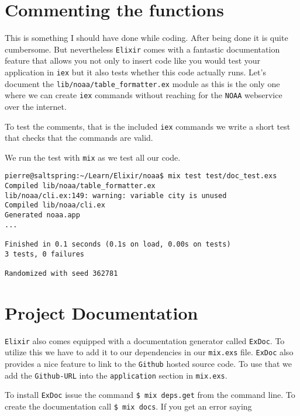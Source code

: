 \documentclass[10pt, a4paper]{article}
\newcommand{\includecode}[3]{}
\begin{document}
\section{Commenting the functions}
This is something I should have done while coding. After being done it is 
quite cumbersome. But nevertheless \texttt{Elixir} comes with a fantastic
documentation feature that allows you not only to insert code like you 
would test your application in \texttt{iex} but it also tests whether this
code actually runs. Let's document the \texttt{lib/noaa/table\_formatter.ex}
module as this is the only one where we can create \texttt{iex} commands without
reaching for the \texttt{NOAA} webservice over the internet.

\includecode{lib/noaa/table\_formatter.ex}{lst:tableformatter2}
            {listings/table-formatter2.ex}

To test the comments, that is the included \texttt{iex} commands we write a
short test that checks that the commands are valid.

\includecode{test/doc\_test.exs}{lst:doctest}{listings/doc-test.exs}

We run the test with \texttt{mix} as we test all our code.

\begin{verbatim}
pierre@saltspring:~/Learn/Elixir/noaa$ mix test test/doc_test.exs
Compiled lib/noaa/table_formatter.ex
lib/noaa/cli.ex:149: warning: variable city is unused
Compiled lib/noaa/cli.ex
Generated noaa.app
...

Finished in 0.1 seconds (0.1s on load, 0.00s on tests)
3 tests, 0 failures

Randomized with seed 362781 
\end{verbatim}

\section{Project Documentation}
\texttt{Elixir} also comes equipped with a documentation generator called
\texttt{ExDoc}. To utilize this we have to add it to our dependencies in our
\texttt{mix.exs} file. \texttt{ExDoc} also provides a nice feature to link
to the \texttt{Github} hosted source code. To use that we add the
\texttt{Github-URL} into the \texttt{application} section in \texttt{mix.exs}.

\includecode{mix.exs}{lst:mix3}{listings/mix3.exs}

To install \texttt{ExDoc} issue the command \texttt{\$ mix deps.get} from
the command line. To create the documentation call \texttt{\$ mix docs}. If 
you get an error saying 
\end{document}
